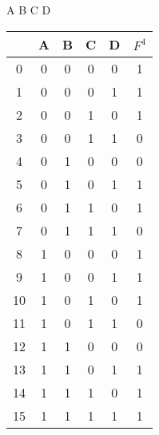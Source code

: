 \documentclass{article}
\begin{document}
\newpage
A B C D
\begin{table}[ht]
    \begin{tabular}{c|c|c|c|c||c}
           & \textbf{A} & \textbf{B} & \textbf{C} & \textbf{D} & \textbf{\(F^4\)} \\
        \hline
        0  & 0          & 0          & 0          & 0          & 1                \\
        \hline
        1  & 0          & 0          & 0          & 1          & 1                \\
        \hline
        2  & 0          & 0          & 1          & 0          & 1                \\
        \hline
        3  & 0          & 0          & 1          & 1          & 0                \\
        \hline
        4  & 0          & 1          & 0          & 0          & 0                \\
        \hline
        5  & 0          & 1          & 0          & 1          & 1                \\
        \hline
        6  & 0          & 1          & 1          & 0          & 1                \\
        \hline
        7  & 0          & 1          & 1          & 1          & 0                \\
        \hline
        8  & 1          & 0          & 0          & 0          & 1                \\
        \hline
        9  & 1          & 0          & 0          & 1          & 1                \\
        \hline
        10 & 1          & 0          & 1          & 0          & 1                \\
        \hline
        11 & 1          & 0          & 1          & 1          & 0                \\
        \hline
        12 & 1          & 1          & 0          & 0          & 0                \\
        \hline
        13 & 1          & 1          & 0          & 1          & 1                \\
        \hline
        14 & 1          & 1          & 1          & 0          & 1                \\
        \hline
        15 & 1          & 1          & 1          & 1          & 1                \\
    \end{tabular}
\end{table}
\end{document}
